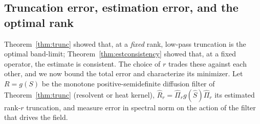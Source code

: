 \documentclass[aps,prresearch,reprint,amsmath,amssymb,nofootinbib,superscriptaddress,floatfix]{revtex4-2}
\theoremstyle{definition}
\theoremstyle{remark}
\theoremstyle{plain}
\begin{document}
\subsection{Truncation error, estimation error, and the optimal rank}
\label{ssub:truncest}
Theorem~\ref{thm:trunc} showed that, at a \emph{fixed} rank, low-pass truncation is the optimal band-limit;
Theorem~\ref{thm:estconsistency} showed that, at a fixed operator, the estimate is consistent. The choice of
$r$ trades these against each other, and we now bound the total error and characterize its minimizer. Let
$R=g(S)$ be the monotone positive-semidefinite diffusion filter of Theorem~\ref{thm:trunc} (resolvent or
heat kernel), $\widehat R_r=\widehat\Pi_r g(\widehat S)\widehat\Pi_r$ its estimated rank-$r$ truncation, and
measure error in spectral norm on the action of the filter that drives the field.
\end{document}
